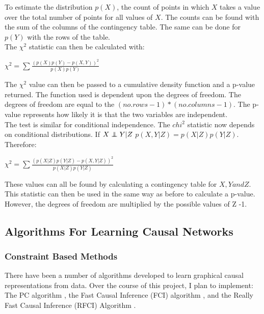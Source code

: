 \documentclass{article}
\newcommand\independent{\protect\mathpalette{\protect\independenT}{\perp}}
\def\independenT#1#2{\mathrel{\rlap{$#1#2$}\mkern2mu{#1#2}}}
\begin{document}
To estimate the distribution $p(X)$, the count of points in which $X$ takes a value over the total number of points for all values of $X$. The counts can be found with the sum of the columns of the contingency table. The same can be done for $p(Y)$ with the rows of the table.\\

The $\chi^2$ statistic can then be calculated with:

\begin{center}
	$\chi^2 = \sum\frac{(p(X)p(Y)-p(X,Y))^2}{p(X)p(Y)}$
\end{center}

The $\chi^2$ value can then be passed to a cumulative density function and a p-value returned. The function used is dependent upon the degrees of freedom. The degrees of freedom are equal to the $(no. rows -1)*(no. columns -1)$. The p-value represents how likely it is that the two variables are independent.\\

The test is similar for conditional independence. The $chi^2$ statistic now depends on conditional distributions. If $X \independent Y | Z$ $p(X,Y|Z) = p(X|Z)p(Y|Z)$. Therefore:\\

\begin{center}
	$\chi^2 = \sum\frac{(p(X|Z)p(Y|Z)-p(X,Y|Z))^2}{p(X|Z)p(Y|Z)}$
\end{center}

These values can all be found by calculating a contingency table for $X,Y and Z$.\\

This statistic can then be used in the same way as before to calculate a p-value. However, the degrees of freedom are multiplied by the possible values of Z -1. 

\subsection{Algorithms For Learning Causal Networks}
\subsubsection{Constraint Based Methods}
 There have been a number of algorithms developed to learn graphical causal representations from data. Over the course of this project, I plan to implement: The PC algorithm \cite{spirtes1991algorithm}, the Fast Causal Inference (FCI) algorithm \cite{colombo2012learning}, and the Really Fast Causal Inference (RFCI) Algorithm \cite{colombo2012learning}.
\\
\end{document}
